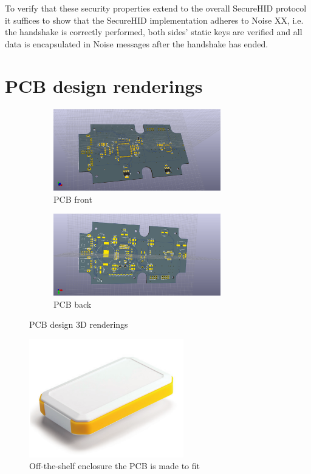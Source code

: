\documentclass[12pt,a4paper,notitlepage]{article}
\begin{document}
To verify that these security properties extend to the overall SecureHID protocol it suffices to show that the SecureHID
implementation adheres to Noise XX, i.e. the handshake is correctly performed, both sides' static keys are verified and
all data is encapsulated in Noise messages after the handshake has ended.

\section{PCB design renderings}
\label{ch:renderings}

\begin{figure}[H]
    \centering
    \begin{subfigure}[b]{0.8\textwidth}
        \centering
        \includegraphics[width=0.8\textwidth]{pcb_front.png}
        \caption{PCB front}
    \end{subfigure} %
    \begin{subfigure}[b]{0.8\textwidth}
        \centering
        \includegraphics[width=0.8\textwidth]{pcb_back.png}
        \caption{PCB back}
    \end{subfigure}
    \caption{PCB design 3D renderings}
    \label{fig:pcb3d}
\end{figure}

\begin{figure}[H]
    \centering
    \includegraphics[width=0.6\textwidth]{takachi_case.png}
    \caption{Off-the-shelf enclosure the PCB is made to fit}
    \label{fig:case}
\end{figure}
\end{document}
